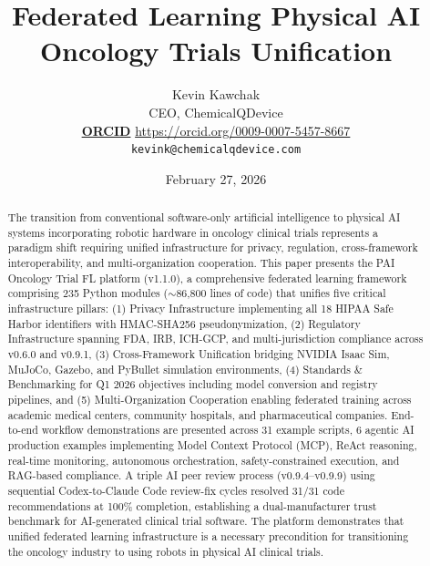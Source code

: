 \documentclass[10pt]{article}
\title{Federated Learning Physical AI Oncology Trials Unification}
\author{
  Kevin Kawchak \\
  CEO, ChemicalQDevice \\
  \href{https://orcid.org/0009-0007-5457-8667}{\textcolor{green!60!black}{\textbf{ORCID}}} \href{https://orcid.org/0009-0007-5457-8667}{https://orcid.org/0009-0007-5457-8667} \\
  \texttt{kevink@chemicalqdevice.com}
}
\date{February 27, 2026}
\begin{document}
\maketitle

\begin{abstract}
The transition from conventional software-only artificial intelligence to physical AI systems incorporating robotic hardware in oncology clinical trials represents a paradigm shift requiring unified infrastructure for privacy, regulation, cross-framework interoperability, and multi-organization cooperation. This paper presents the PAI Oncology Trial FL platform (v1.1.0), a comprehensive federated learning framework comprising 235 Python modules ($\sim$86,800 lines of code) that unifies five critical infrastructure pillars: (1) Privacy Infrastructure implementing all 18 HIPAA Safe Harbor identifiers with HMAC-SHA256 pseudonymization, (2) Regulatory Infrastructure spanning FDA, IRB, ICH-GCP, and multi-jurisdiction compliance across v0.6.0 and v0.9.1, (3) Cross-Framework Unification bridging NVIDIA Isaac Sim, MuJoCo, Gazebo, and PyBullet simulation environments, (4) Standards \& Benchmarking for Q1 2026 objectives including model conversion and registry pipelines, and (5) Multi-Organization Cooperation enabling federated training across academic medical centers, community hospitals, and pharmaceutical companies. End-to-end workflow demonstrations are presented across 31 example scripts, 6 agentic AI production examples implementing Model Context Protocol (MCP), ReAct reasoning, real-time monitoring, autonomous orchestration, safety-constrained execution, and RAG-based compliance. A triple AI peer review process (v0.9.4--v0.9.9) using sequential Codex-to-Claude Code review-fix cycles resolved 31/31 code recommendations at 100\% completion, establishing a dual-manufacturer trust benchmark for AI-generated clinical trial software. The platform demonstrates that unified federated learning infrastructure is a necessary precondition for transitioning the oncology industry to using robots in physical AI clinical trials.

\end{abstract}

\vspace{-0.5em}
\tableofcontents
\vspace{0.5em}
\end{document}
